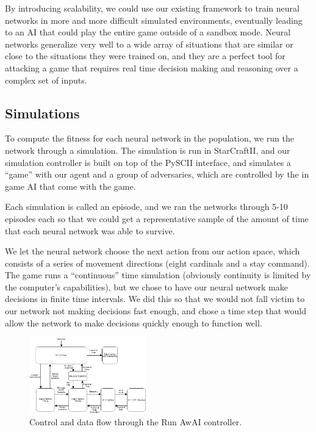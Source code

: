 \documentclass{article}
\begin{document}
By introducing scalability, we could use our existing framework to train neural
networks in more and more difficult simulated environments, eventually leading
to an AI that could play the entire game outside of a sandbox mode. Neural
networks generalize very well to a wide array of situations that are similar or
close to the situations they were trained on, and they are a perfect tool for
attacking a game that requires real time decision making and reasoning over a
complex set of inputs.

\subsection{Simulations}
To compute the fitness for each neural network in the population, we run the
network through a simulation. The simulation is run in StarCraftII, and our
simulation controller is built on top of the PySCII interface, and simulates
a ``game'' with our agent and a group of adversaries, which are controlled by
the in game AI that come with the game.

Each simulation is called an episode, and we ran the networks through 5-10
episodes each so that we could get a representative sample of the amount of time
that each neural network was able to survive.

We let the neural network choose the next action from our action space, which
consists of a series of movement directions (eight cardinals and a stay
command). The game runs a ``continuous'' time simulation (obviously continuity
is limited by the computer's capabilities), but we chose to have our neural
network make decisions in finite time intervals. We did this so that we would
not fall victim to our network not making decisions fast enough, and chose a
time step that would allow the network to make decisions quickly enough to
function well.

\begin{figure}[h]\label{fig:flow chart}
\centering
\includegraphics[width=0.45\textwidth]{chart}
\begin{changemargin}{0.15in}{0.15in}
  \caption{Control and data flow through the Run AwAI controller.}
\end{changemargin}
\end{figure}
\end{document}
